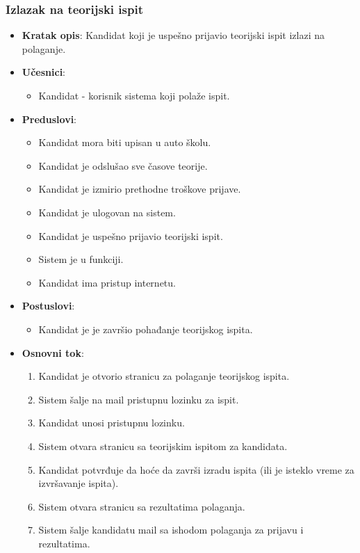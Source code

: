 \subsubsection{Izlazak na teorijski ispit}
\label{subsubsec:teorijski ispit}
\begin{itemize}
  \item \textbf{Kratak opis}: Kandidat koji je uspešno prijavio teorijski ispit izlazi na polaganje.
  \item \textbf{Učesnici}:
    \begin{itemize}
    \item Kandidat - korisnik sistema koji polaže ispit.
    \end{itemize}
  \item \textbf{Preduslovi}:
    \begin{itemize}
    \item  Kandidat mora biti upisan u auto školu.
    \item  Kandidat je odslušao sve časove teorije.
    \item  Kandidat je izmirio prethodne troškove prijave.
    \item  Kandidat je ulogovan na sistem.
    \item  Kandidat je uspešno prijavio teorijski ispit.
    \item  Sistem je u funkciji.
    \item  Kandidat ima pristup internetu.
    \end{itemize}
  \item \textbf{Postuslovi}:
      \begin{itemize}
      \item  Kandidat je je završio pohađanje teorijskog ispita.
      \end{itemize}
  \item \textbf{Osnovni tok}:
      \begin{enumerate}
        \item Kandidat je otvorio stranicu za polaganje teorijskog ispita.
        \item Sistem šalje na mail pristupnu lozinku za ispit.
        \item Kandidat unosi pristupnu lozinku.
        \item Sistem otvara stranicu sa teorijskim ispitom za kandidata.
        \item Kandidat potvrđuje da hoće da završi izradu ispita (ili je isteklo vreme za izvršavanje ispita).
        \item Sistem otvara stranicu sa rezultatima polaganja.
        \item Sistem šalje kandidatu mail sa ishodom polaganja za prijavu i rezultatima.
      \end{enumerate}


\end{itemize}
